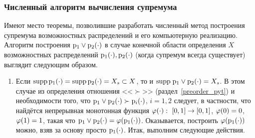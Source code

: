 \subsubsection{Численный алгоритм вычисления супремума}
\label{algo_sup_poss}

Имеют место теоремы, позволившие разработать численный метод построения супремума возможностных распределений и его компьютерную реализацию. Алгоритм построения ${\mathrm{p}}_1 \vee{\mathrm{p}}_2(\cdot)$ в случае конечной области определения $X$ возможностных распределений ${\mathrm{p}}_1(\cdot), {\mathrm{p}}_2(\cdot)$ (когда супремум всегда существует) выглядит следующим образом.
\begin{enumerate}
	\item 
		Если ${\mathrm{supp}}\,{\mathrm{p}}_1(\cdot) = {\mathrm{supp}}\,{\mathrm{p}}_2(\cdot) = X_s \subset X$, то и ${\mathrm{supp}} \; {\mathrm{p}}_1 \vee{\mathrm{p}}_2(\cdot) = X_s$. В этом случае из определения отношения <<$\succ$>> (раздел~\ref{preorder_pyt}) и необходимости того, что ${\mathrm{p}}_1 \vee{\mathrm{p}}_2(\cdot) \succ {\mathrm{p}}_i(\cdot)$, $i=1,2$ следует, в частности, что найдётся непрерывная монотонная функция ${\varphi(\cdot):\ [0,1]\to[0,1]}$, $\varphi(0) = 0$, $\varphi(1) = 1$, такая что ${\mathrm{p}}_1 \vee{\mathrm{p}}_2(\cdot) = \varphi({\mathrm{p}}_1(\cdot))$. Оказывается, построить $\varphi({\mathrm{p}}_1(\cdot))$ можно, взяв за основу просто ${\mathrm{p}}_1(\cdot)$. Итак, выполним следующие действия.  %

\end{enumerate}
